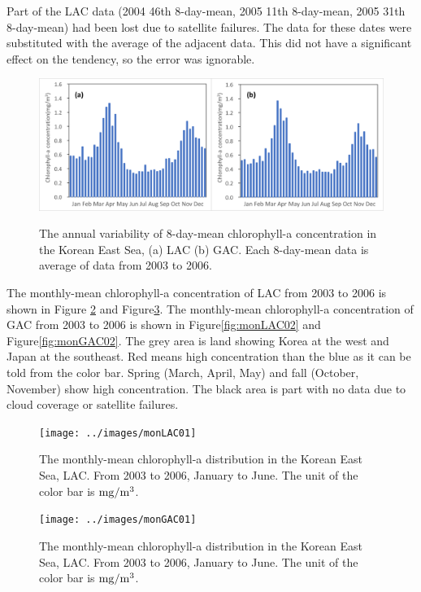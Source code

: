 Part of the LAC data (2004 46th 8-day-mean, 2005 11th 8-day-mean, 2005 31th 8-day-mean) had been lost due to satellite failures. The data for these dates were substituted with the average of the adjacent data. This did not have a significant effect on the tendency, so the error was ignorable.
  
 \begin{figure}[b]
	\centering
	\includegraphics[width=1.0\linewidth]{../images/annualwky}\\
	\caption{The annual variability of 8-day-mean chlorophyll-a concentration in the Korean East Sea, (a) LAC (b) GAC. Each 8-day-mean data is average of data from 2003 to 2006.}
	\label{fig:annuawkly}
\end{figure}

  
 
The monthly-mean chlorophyll-a concentration of LAC from 2003 to 2006 is shown in Figure \ref{fig:monLAC01} and Figure\ref{fig:monGAC01}. The monthly-mean chlorophyll-a concentration of GAC from 2003 to 2006 is shown in Figure\ref{fig:monLAC02} and Figure\ref{fig:monGAC02}. The grey area is land showing Korea at the west and Japan at the southeast. Red means high concentration than the blue as it can be told from the color bar. Spring (March, April, May) and fall (October, November) show high concentration. The black area is part with no data due to cloud coverage or satellite failures. 

\begin{figure}[t]
	\centering
	\texttt{[image: ../images/monLAC01]}\\
	\caption{The monthly-mean chlorophyll-a distribution in the Korean East Sea, LAC. From 2003 to 2006, January to June. The unit of the color bar is $\rm mg/m^3$.}
	\label{fig:monLAC01}
\end{figure}
    
\begin{figure}[p]
	\centering
	\texttt{[image: ../images/monGAC01]}\\
	\caption{The monthly-mean chlorophyll-a distribution in the Korean East Sea, LAC. From 2003 to 2006, January to June. The unit of the color bar is $\rm mg/m^3$.}
	\label{fig:monGAC01}
\end{figure}


